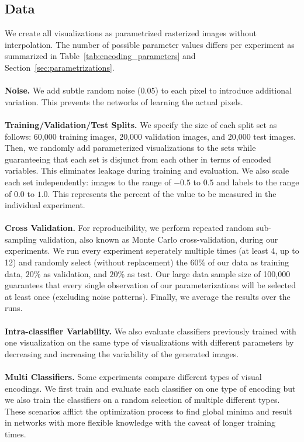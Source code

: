 \subsection{Data}
\label{sec:data}
We create all visualizations as parametrized rasterized images without interpolation. The number of possible parameter values differs per experiment as summarized in Table~\ref{tab:encoding_parameters} and Section~\ref{sec:parametrizations}. 
\\~\\
\noindent\textbf{Noise.} We add subtle random noise ($0.05$) to each pixel to introduce additional variation. This prevents the networks of learning the actual pixels.
\\~\\
\noindent\textbf{Training/Validation/Test Splits.} We specify the size of each split set as follows: 60,000 training images, 20,000 validation images, and 20,000 test images. Then, we randomly add parameterized visualizations to the sets while guaranteeing that each set is disjunct from each other in terms of encoded variables. This eliminates leakage during training and evaluation. We also scale each set independently: images to the range of $-0.5$ to $0.5$ and labels to the range of $0.0$ to $1.0$. This represents the percent of the value to be measured in the individual experiment. %
\\~\\
\noindent\textbf{Cross Validation.} For reproducibility, we perform repeated random sub-sampling validation, also known as Monte Carlo cross-validation, during our experiments. We run every experiment seperately multiple times (at least 4, up to 12) and randomly select (without replacement) the $60\%$ of our data as training data, $20\%$ as validation, and $20\%$ as test. Our large data sample size of 100,000 guarantees that every single observation of our parameterizations will be selected at least once (excluding noise patterns). Finally, we average the results over the runs.
\\~\\
\noindent\textbf{Intra-classifier Variability.} We also evaluate classifiers previously trained with one visualization on the same type of visualizations with different parameters by decreasing and increasing the variability of the generated images.
\\~\\
\noindent\textbf{Multi Classifiers.} Some experiments compare different types of visual encodings. We first train and evaluate each classifier on one type of encoding but we also train the classifiers on a random selection of multiple different types. These scenarios afflict the optimization process to find global minima and result in networks with more flexible knowledge with the caveat of longer training times.


